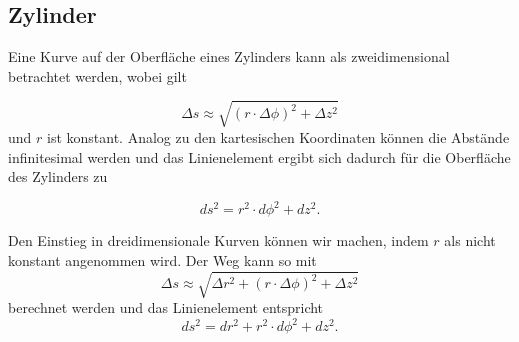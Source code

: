 %
%
%
%
\subsection{Zylinder\label{geodaeten:section:Linienelemente:Zylinder}}

Eine Kurve auf der Oberfläche eines Zylinders kann als zweidimensional betrachtet werden, wobei gilt

\begin{equation}
	\Delta s \approx \sqrt{(r \cdot \Delta \phi)^2 + \Delta z^2}
\end{equation}
und $r$ ist konstant.
Analog zu den kartesischen Koordinaten können die Abstände infinitesimal werden und das Linienelement ergibt sich dadurch für die Oberfläche des Zylinders zu

\begin{equation}
	ds^2 = r^2 \cdot d \phi^2 + d z^2 .
	\label{geodaeten:equation:Linienelemente:Zylinder:equation2}
\end{equation}

%

Den Einstieg in dreidimensionale Kurven können wir machen, indem $r$ als nicht konstant angenommen wird.
Der Weg kann so mit
\begin{equation}
	\Delta s \approx \sqrt{\Delta r^2 + (r \cdot \Delta \phi)^2 + \Delta z^2} %
\end{equation}
berechnet werden und das Linienelement entspricht 
\begin{equation}
	ds^2 = d r^2 + r^2 \cdot d \phi^2 + d z^2 .
	\label{geodaeten:equation:Linienelemente:Zylinder:Zylinder3D}
\end{equation}

